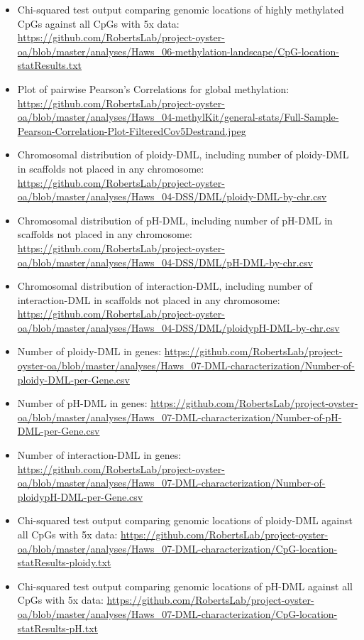 \documentclass [11pt, proquest] {uwthesis}[2015/03/03]
\providecommand{\tightlist}{%
  \setlength{\itemsep}{0pt}\setlength{\parskip}{0pt}}
\begin{document}
\begin{itemize}
\tightlist
\item
  Chi-squared test output comparing genomic locations of highly methylated CpGs against all CpGs with 5x data: \url{https://github.com/RobertsLab/project-oyster-oa/blob/master/analyses/Haws_06-methylation-landscape/CpG-location-statResults.txt}
\item
  Plot of pairwise Pearson's Correlations for global methylation: \url{https://github.com/RobertsLab/project-oyster-oa/blob/master/analyses/Haws_04-methylKit/general-stats/Full-Sample-Pearson-Correlation-Plot-FilteredCov5Destrand.jpeg}
\item
  Chromosomal distribution of ploidy-DML, including number of ploidy-DML in scaffolds not placed in any chromosome: \url{https://github.com/RobertsLab/project-oyster-oa/blob/master/analyses/Haws_04-DSS/DML/ploidy-DML-by-chr.csv}
\item
  Chromosomal distribution of pH-DML, including number of pH-DML in scaffolds not placed in any chromosome: \url{https://github.com/RobertsLab/project-oyster-oa/blob/master/analyses/Haws_04-DSS/DML/pH-DML-by-chr.csv}
\item
  Chromosomal distribution of interaction-DML, including number of interaction-DML in scaffolds not placed in any chromosome: \url{https://github.com/RobertsLab/project-oyster-oa/blob/master/analyses/Haws_04-DSS/DML/ploidypH-DML-by-chr.csv}
\item
  Number of ploidy-DML in genes: \url{https://github.com/RobertsLab/project-oyster-oa/blob/master/analyses/Haws_07-DML-characterization/Number-of-ploidy-DML-per-Gene.csv}
\item
  Number of pH-DML in genes: \url{https://github.com/RobertsLab/project-oyster-oa/blob/master/analyses/Haws_07-DML-characterization/Number-of-pH-DML-per-Gene.csv}
\item
  Number of interaction-DML in genes: \url{https://github.com/RobertsLab/project-oyster-oa/blob/master/analyses/Haws_07-DML-characterization/Number-of-ploidypH-DML-per-Gene.csv}
\item
  Chi-squared test output comparing genomic locations of ploidy-DML against all CpGs with 5x data: \url{https://github.com/RobertsLab/project-oyster-oa/blob/master/analyses/Haws_07-DML-characterization/CpG-location-statResults-ploidy.txt}
\item
  Chi-squared test output comparing genomic locations of pH-DML against all CpGs with 5x data: \url{https://github.com/RobertsLab/project-oyster-oa/blob/master/analyses/Haws_07-DML-characterization/CpG-location-statResults-pH.txt}

\end{itemize}
\end{document}
